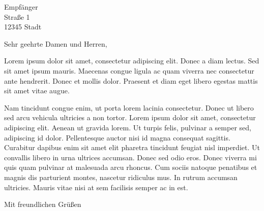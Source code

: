 \documentclass[%
	fontsize=11pt,	%
	paper=a4,	%
	parskip=half*,  %
	version=last,
	fromlogo,
]{scrartcl}
\begin{document}

\begin{letter}{

		Empfänger\\
		Straße 1\\
		12345 Stadt
	}

	\opening{Sehr geehrte Damen und Herren,}
	Lorem ipsum dolor sit amet, consectetur adipiscing elit. Donec a diam lectus. Sed sit amet ipsum mauris. 
	Maecenas congue ligula ac quam viverra nec consectetur ante hendrerit. Donec et mollis dolor. 
	Praesent et diam eget libero egestas mattis sit amet vitae augue. 

	Nam tincidunt congue enim, ut porta lorem lacinia consectetur. Donec ut libero sed arcu 
	vehicula ultricies a non tortor. Lorem ipsum dolor sit amet, consectetur adipiscing elit. 
	Aenean ut gravida lorem. Ut turpis felis, pulvinar a semper sed, adipiscing id dolor. Pellentesque auctor 
	nisi id magna consequat sagittis. Curabitur dapibus enim sit amet elit pharetra tincidunt feugiat nisl imperdiet.
	Ut convallis libero in urna ultrices accumsan. Donec sed odio eros. Donec viverra mi quis quam pulvinar at 
	malesuada arcu rhoncus. Cum sociis natoque penatibus et magnis dis parturient montes, nascetur ridiculus mus. 
	In rutrum accumsan ultricies. Mauris vitae nisi at sem facilisis semper ac in est.


	\closing{Mit freundlichen Grüßen}


\end{letter}
\end{document}
